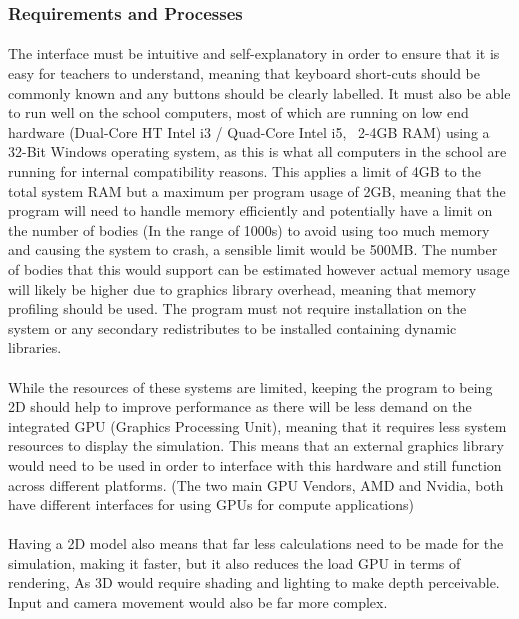 \subsubsection{Requirements and Processes}
\paragraph{}
The interface must be intuitive and self-explanatory in order to ensure that it is easy for teachers to understand, meaning that keyboard short-cuts should be commonly known and any buttons should be clearly labelled. It must also be able to run well on the school computers, most of which are running on low end hardware (Dual-Core HT Intel i3 / Quad-Core Intel i5, ~2-4GB RAM) using a 32-Bit Windows operating system, as this is what all computers in the school are running for internal compatibility reasons. This applies a limit of 4GB to the total system RAM but a maximum per program usage of 2GB, meaning that the program will need to handle memory efficiently and potentially have a limit on the number of bodies (In the range of 1000s) to avoid using too much memory and causing the system to crash, a sensible limit would be 500MB. The number of bodies that this would support can be estimated however actual memory usage will likely be higher due to graphics library overhead, meaning that memory profiling should be used. The program must not require installation on the system or any secondary redistributes to be installed containing dynamic libraries.

\paragraph{}
While the resources of these systems are limited, keeping the program to being 2D should help to improve performance as there will be less demand on the integrated GPU (Graphics Processing Unit), meaning that it requires less system resources to display the simulation. This means that an external graphics library would need to be used in order to interface with this hardware and still function across different platforms. (The two main GPU Vendors, AMD and Nvidia, both have different interfaces for using GPUs for compute applications) 

\paragraph{}Having a 2D model also means that far less calculations need to be made for the simulation, making it faster, but it also reduces the load GPU in terms of rendering, As 3D would require shading and lighting to make depth perceivable. Input and camera movement would also be far more complex.

